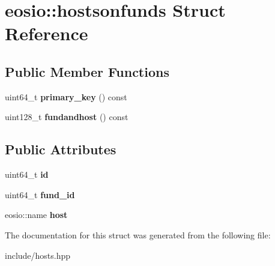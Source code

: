 \hypertarget{structeosio_1_1hostsonfunds}{}\section{eosio\+:\+:hostsonfunds Struct Reference}
\label{structeosio_1_1hostsonfunds}
\subsection*{Public Member Functions}
\begin{DoxyCompactItemize}
\item 
\mbox{\label{structeosio_1_1hostsonfunds_ada55c8e752f854b89a7e47034a43db10}} 
uint64\+\_\+t {\bfseries primary\+\_\+key} () const
\item 
\mbox{\label{structeosio_1_1hostsonfunds_a4a8ec164a85d5f8de7198368dd04bf0d}} 
uint128\+\_\+t {\bfseries fundandhost} () const
\end{DoxyCompactItemize}
\subsection*{Public Attributes}
\begin{DoxyCompactItemize}
\item 
\mbox{\label{structeosio_1_1hostsonfunds_a351f66bd69390b6db46708581e762d77}} 
uint64\+\_\+t {\bfseries id}
\item 
\mbox{\label{structeosio_1_1hostsonfunds_a914f5ade7343c8bc5ec58d0f7fb6f54b}} 
uint64\+\_\+t {\bfseries fund\+\_\+id}
\item 
\mbox{\label{structeosio_1_1hostsonfunds_a0ed47698fd44c85355e21cdd53b5cd41}} 
eosio\+::name {\bfseries host}
\end{DoxyCompactItemize}


The documentation for this struct was generated from the following file\+:\begin{DoxyCompactItemize}
\item 
include/hosts.\+hpp\end{DoxyCompactItemize}
